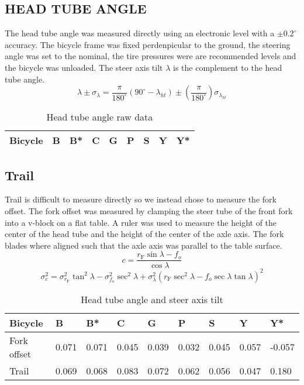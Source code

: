 \documentclass{bmd2010p}
\begin{document}
\subsection{HEAD TUBE ANGLE}
The head tube angle was measured directly using an electronic level with a
$\pm0.2^{\circ}$ accuracy. The bicycle frame was fixed perdenpicular to the
ground, the steering angle was set to the nominal, the tire pressures were are
recommended levels and the bicycle was unloaded. The steer axis
tilt $\lambda$ is the complement to the head tube angle.
\begin{equation}
    \lambda\pm\sigma_\lambda
    =\frac{\pi}{180^{\circ}}(90^{\circ}-\lambda_{ht})
    \pm\left(\frac{\pi}{180^\circ}\right)\sigma_{\lambda_{ht}}
\label{eq:headTubeAngle}
\end{equation}
\begin{table}
	\begin{tabular}{lllllllll}
	Bicycle   & B      & B*     & C      & G      & P      & S      & Y      & Y*\\
    \hline
	\end{tabular}
	\caption{Head tube angle raw data}
	\label{tab:lambda}
\end{table}

\subsection{Trail}
Trail is difficult to measure directly so we instead chose to measure the fork
offset. The fork offset was measured by clamping the steer tube of the front
fork into a v-block on a flat table. A ruler was used to measure the height of
the center of the head tube and the height of the center of the axle axis. The
fork blades where aligned such that the axle axis was parallel to the table
surface.
\begin{equation}
	c=\frac{r_\mathrm{F}\sin{\lambda}-f_o}{\cos{\lambda}}
	\label{eq:trail}
\end{equation}
\begin{equation}
    \sigma_{c}^{2}=\sigma_{r_{\mathrm{F}}}^{2}\tan^2{\lambda} -
    \sigma_{f_o}^{2}\sec^2{\lambda} +
    \sigma_{\lambda}^{2}\left(r_\mathrm{F}\sec^2{\lambda} -
    f_o\sec{\lambda}\tan{\lambda}\right)^2
    \label{eq:TrailVar}
\end{equation}
\begin{table}
	\begin{tabular}{lllllllll}
	Bicycle     & B     & B*    & C     & G     & P     & S     & Y     & Y*\\
    \hline
	Fork offset & 0.071 & 0.071 & 0.045 & 0.039 & 0.032 & 0.045 & 0.057 & -0.057\\
	Trail       & 0.069 & 0.068 & 0.083 & 0.072 & 0.062 & 0.056 & 0.047 & 0.180
	\end{tabular}
	\caption{Head tube angle and steer axis tilt}
	\label{tab:trail}
\end{table}
\end{document}
